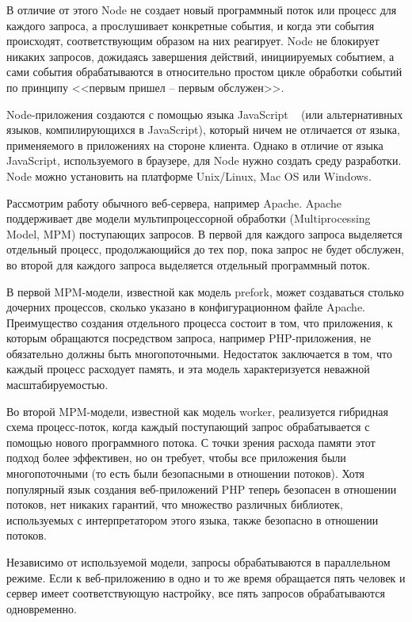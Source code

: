 В отличие от этого Node не создает новый программный поток или процесс для каждого запроса, а прослушивает конкретные события, и когда эти события происходят, соответствующим образом на них реагирует. Node не блокирует никаких запросов, дожидаясь завершения действий, инициируемых событием, а сами события обрабатываются в относительно простом цикле обработки событий по принципу <<первым пришел -- первым обслужен>>.

Node-приложения создаются с помощью языка JavaScript ~\cite{js} (или альтернативных языков, компилирующихся в JavaScript), который ничем не отличается от языка, применяемого в приложениях на стороне клиента. Однако в отличие от языка JavaScript, используемого в браузере, для Node нужно создать среду разработки. Node можно установить на платформе Unix/Linux, Mac OS или Windows.

Рассмотрим работу обычного веб-сервера, например Apache. Apache поддерживает две модели мультипроцессорной обработки (Multiprocessing Model, MPM) поступающих запросов. В первой для каждого запроса выделяется отдельный процесс, продолжающийся до тех пор, пока запрос не будет обслужен, во второй для каждого запроса выделяется отдельный программный поток.

В первой MPM-модели, известной как модель prefork, может создаваться столько дочерних процессов, сколько указано в конфигурационном файле Apache. Преимущество создания отдельного процесса состоит в том, что приложения, к которым обращаются посредством запроса, например PHP-приложения, не обязательно должны быть многопоточными. Недостаток заключается в том, что каждый процесс расходует память, и эта модель характеризуется неважной масштабируемостью.

Во второй MPM-модели, известной как модель worker, реализуется гибридная схема процесс-поток, когда каждый поступающий запрос обрабатывается с помощью нового программного потока. С точки зрения расхода памяти этот подход более эффективен, но он требует, чтобы все приложения были многопоточными (то есть были безопасными в отношении потоков). Хотя популярный язык создания веб-приложений PHP теперь безопасен в отношении потоков, нет никаких гарантий, что множество различных библиотек, используемых с интерпретатором этого языка, также безопасно в отношении потоков.

Независимо от используемой модели, запросы обрабатываются в параллельном режиме. Если к веб-приложению в одно и то же время обращается пять человек и сервер имеет соответствующую настройку, все пять запросов обрабатываются одновременно.

